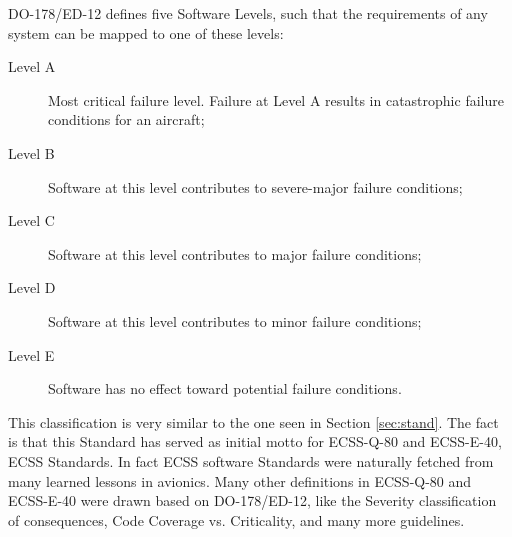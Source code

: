 DO-178/ED-12 defines five Software Levels\cite{ed-12b}, such that the requirements of any system can be mapped to one
of these levels:
\begin{description}
\item[Level A] Most critical failure level. Failure at Level A results in catastrophic failure conditions for an aircraft;
\item[Level B] Software at this level contributes to severe-major failure conditions;
\item[Level C] Software at this level contributes to major failure conditions;
\item[Level D] Software at this level contributes to minor failure conditions;
\item[Level E] Software has no effect toward potential failure conditions.
\end{description}
This classification is very similar to the one seen in Section \ref{sec:stand}.
The fact is that this Standard has served as initial motto for ECSS-Q-80\cite{ecss-q-st-80c} and ECSS-E-40\cite{ecss-e-st-40c}, \ac{ECSS} Standards.
In fact \ac{ECSS} software Standards were naturally fetched from many learned lessons in avionics.
Many other definitions in ECSS-Q-80\cite{ecss-q-st-80c} and ECSS-E-40\cite{ecss-e-st-40c} were drawn based on DO-178/ED-12, like the
Severity classification of consequences, Code Coverage vs. Criticality, and many more guidelines.


